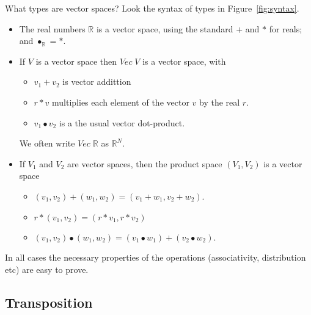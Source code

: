 \documentclass[sigplan,review]{acmart}
\renewcommand{\vector}[1]{\mathit{Vec}\;#1}   %
\newcommand{\real}{\mathbb{R}}       %
\newcommand{\dotprod}{\bullet}    %
\begin{document}
What types are vector spaces?  Look the syntax of types in Figure~\ref{fig:syntax}.
\begin{itemize}
  \item The real numbers $\real$ is a vector space, using the standard $+$ and $*$ for reals; and $\dotprod_{\real} = *$.
  \item If $V$ is a vector space then $\vector{V}$ is a vector space, with
    \begin{itemize}
      \item $v_1 + v_2$ is vector addittion
      \item $r * v$ multiplies each element of the vector $v$ by the real $r$.
      \item $v_1 \dotprod v_2$ is a the usual vector dot-product.
    \end{itemize}
    We often write $\vector{\real}$ as $\real^N$.
  \item If $V_1$ and $V_2$ are vector spaces, then the product space $(V_1, V_2)$ is a vector space
    \begin{itemize}
      \item $(v_1,v_2) +(w_1,w_2) = (v_1 + w_1, v_2 + w_2)$.
      \item $r * (v_1,v_2) = (r*v_1, r*v_2)$
      \item $(v_1,v_2) \dotprod (w_1,w_2) = (v_1 \dotprod w_1) + (v_2 \dotprod w_2)$.
    \end{itemize}
\end{itemize}
In all cases the necessary properties of the operations (associativity, distribution etc) are easy to prove.

\subsection{Transposition}
\end{document}
